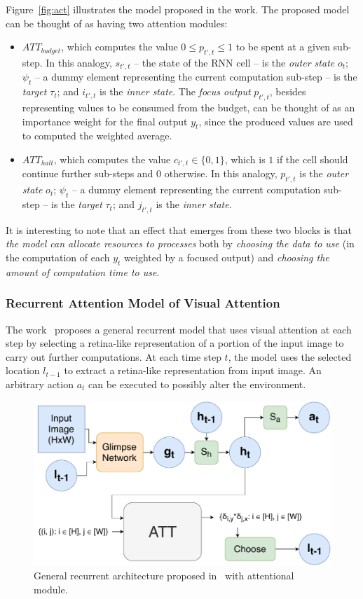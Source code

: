 \documentclass[12pt]{article}
\begin{document}
Figure~\ref{fig:act} illustrates the model proposed in the work.
The proposed model can be thought of as having two attention modules:
\begin{itemize}
    \item \textbf{$ATT_{budget}$}, which computes the value $0 \le p_{t',t} \le 1$ to be spent at a given sub-step.
        In this analogy, $s_{t',t}$ -- the state of the RNN cell -- is the \emph{outer state} $o_t$;
        $\psi_t$ -- a dummy element representing the current computation sub-step -- is the \emph{target} $\tau_t$;
        and $i_{t',t}$ is the \emph{inner state}.
        The \emph{focus output} $p_{t',t}$, besides representing values to be consumed from the budget,
        can be thought of as an importance weight for the final output $y_t$, since the produced values are used to computed
        the weighted average.
    \item \textbf{$ATT_{halt}$}, which computes the value $c_{t',t} \in \{0, 1\}$, which is $1$ if the cell should continue
        further sub-steps and $0$ otherwise.
        In this analogy, $p_{t',t}$ is the \emph{outer state} $o_t$;
        $\psi_t$ -- a dummy element representing the current computation sub-step -- is the \emph{target} $\tau_t$;
        and $j_{t',t}$ is the \emph{inner state}.
\end{itemize}

It is interesting to note that an effect that emerges from these two blocks is that
\emph{the model can allocate resources to processes} both by
\emph{choosing the data to use} (in the computation of each $y_t$ weighted by a focused output)
and \emph{choosing the amount of computation time to use}.

\subsubsection{Recurrent Attention Model of Visual Attention}
The work~\cite{ref:rec-models} proposes a general recurrent model that uses visual attention at each step
by selecting a retina-like representation of a portion of the input image to carry out further computations.
At each time step $t$, the model uses the selected location $l_{t-1}$ to extract a retina-like representation
from input image.
An arbitrary action $a_t$ can be executed to possibly alter the environment.

\begin{figure}[H]
    \centering
    \includegraphics[width=0.6\linewidth]{./img/ram.pdf}
    \caption{General recurrent architecture proposed in~\cite{ref:ram} with attentional module.}
\label{fig:ram}
\end{figure}
\end{document}

